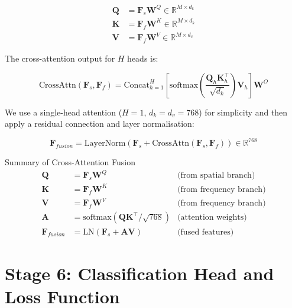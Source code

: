 \documentclass[12pt,a4paper]{article}
\begin{document}
\begin{align}
  \mathbf{Q} &= \mathbf{F}_s \mathbf{W}^Q \in \mathbb{R}^{M \times d_k} \\
  \mathbf{K} &= \mathbf{F}_f \mathbf{W}^K \in \mathbb{R}^{M \times d_k} \\
  \mathbf{V} &= \mathbf{F}_f \mathbf{W}^V \in \mathbb{R}^{M \times d_v}
\end{align}

The cross-attention output for $H$ heads is:

\begin{equation}
  \text{CrossAttn}(\mathbf{F}_s, \mathbf{F}_f) =
  \text{Concat}_{h=1}^{H}\!\left[
    \text{softmax}\!\left(\frac{\mathbf{Q}_h \mathbf{K}_h^\top}{\sqrt{d_k}}\right)
    \mathbf{V}_h
  \right] \mathbf{W}^O
\end{equation}

We use a single-head attention ($H = 1$, $d_k = d_v = 768$) for simplicity and then
apply a residual connection and layer normalisation:

\begin{equation}
  \mathbf{F}_{fusion} = \text{LayerNorm}\!\left(
    \mathbf{F}_s + \text{CrossAttn}(\mathbf{F}_s, \mathbf{F}_f)
  \right) \in \mathbb{R}^{768}
\end{equation}

\begin{mathbox}{Summary of Cross-Attention Fusion}
\begin{align*}
  \mathbf{Q} &= \mathbf{F}_s \mathbf{W}^Q \qquad & \text{(from spatial branch)} \\
  \mathbf{K} &= \mathbf{F}_f \mathbf{W}^K \qquad & \text{(from frequency branch)} \\
  \mathbf{V} &= \mathbf{F}_f \mathbf{W}^V \qquad & \text{(from frequency branch)} \\
  \mathbf{A} &= \text{softmax}\!\left(\mathbf{Q}\mathbf{K}^\top / \sqrt{768}\right) & \text{(attention weights)} \\
  \mathbf{F}_{fusion} &= \text{LN}\!\left(\mathbf{F}_s + \mathbf{A}\mathbf{V}\right) & \text{(fused features)}
\end{align*}
\end{mathbox}

\newpage

\section{Stage 6: Classification Head and Loss Function}
\end{document}
